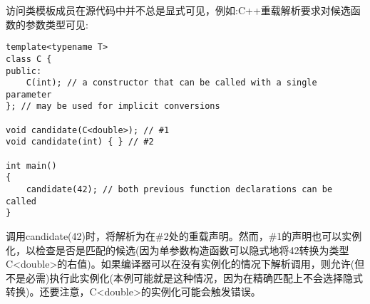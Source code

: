 访问类模板成员在源代码中并不总是显式可见，例如:C++重载解析要求对候选函数的参数类型可见:

\begin{lstlisting}[style=styleCXX]
template<typename T>
class C {
public:
	C(int); // a constructor that can be called with a single parameter
}; // may be used for implicit conversions

void candidate(C<double>); // #1
void candidate(int) { } // #2

int main()
{
	candidate(42); // both previous function declarations can be called
}
\end{lstlisting}

调用candidate(42)时，将解析为在\#2处的重载声明。然而，\#1的声明也可以实例化，以检查是否是匹配的候选(因为单参数构造函数可以隐式地将42转换为类型C<double>的右值)。如果编译器可以在没有实例化的情况下解析调用，则允许(但不是必需)执行此实例化(本例可能就是这种情况，因为在精确匹配上不会选择隐式转换)。还要注意，C<double>的实例化可能会触发错误。




























